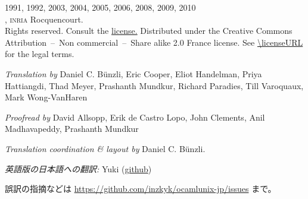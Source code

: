 %
%

\maketitle
\newpage

\begin{copyrightnotice}
\textcopyright{} 1991, 1992, 2003, 2004, 2005, 2006, 2008, 2009, 2010 \\
\myauthors, \textsc{inria} Rocquencourt.\\
Rights reserved.
\ifhtmlelse
    {Consult the \href{LICENSE}{license.}  \href{\licenseURL}%
      {}
    }
    {Distributed under the Creative Commons Attribution~--~Non
     commercial~--~Share alike 2.0 France license. See
     \url{\licenseURL} for the legal terms.}

\emph{Translation by}
Daniel C. Bünzli,
Eric Cooper,
Eliot Handelman,
Priya Hattiangdi,
Thad Meyer,
Prashanth Mundkur,
Richard Paradies,
Till Varoquaux,
Mark Wong-VanHaren

\emph{Proofread by}
David Allsopp,
Erik de Castro Lopo,
John Clements,
Anil Madhavapeddy,
Prashanth Mundkur

\emph{Translation coordination \& layout by} Daniel C. Bünzli.

\emph{英語版の日本語への翻訳: } Yuki (\href{https://github.com/inzkyk}{github})

誤訳の指摘などは \url{https://github.com/inzkyk/ocamlunix-jp/issues} まで。

\end{copyrightnotice}

